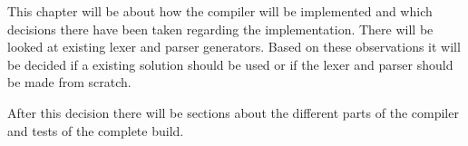 This chapter will be about how the compiler will be implemented and which decisions there have been taken regarding the implementation. There will be looked at existing lexer and parser generators. Based on these observations it will be decided if a existing solution should be used or if the lexer and parser should be made from scratch.

After this decision there will be sections about the different parts of the compiler and tests of the complete build.